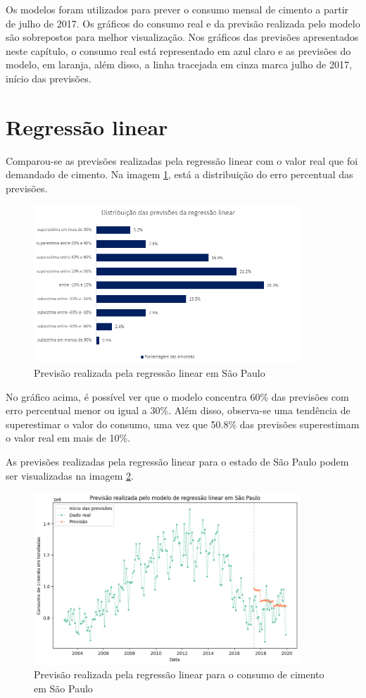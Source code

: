 Os modelos foram utilizados para prever o consumo mensal de 
cimento a partir de julho de 2017. Os gráficos do consumo real 
e da previsão realizada pelo modelo são sobrepostos para melhor
visualização. Nos gráficos das previsões apresentados neste 
capítulo, o consumo real está representado em azul claro e 
as previsões do modelo, em laranja, além disso, a linha 
tracejada em cinza marca julho de 2017, início das previsões.

\section{Regressão linear}

Comparou-se as previsões realizadas pela regressão linear com o valor real 
que foi demandado de cimento. Na imagem \ref{img:erro-perc-rg}, está a 
distribuição do erro percentual das previsões.

\begin{figure}[H]
    \centering
    \includegraphics[width=10cm]{../figuras/graficos/reg_lin/erro-perc-rg.png}
    \caption{Previsão realizada pela regressão linear em São Paulo}
    \label{img:erro-perc-rg}
\end{figure}

No gráfico acima, é possível ver que o modelo concentra 60\% das previsões 
com erro percentual menor ou igual a 30\%. Além disso, observa-se uma 
tendência de superestimar o valor do consumo, uma vez que 50.8\% das previsões
superestimam o valor real em mais de 10\%. 

As previsões realizadas pela regressão linear para o estado 
de São Paulo podem ser visualizadas na imagem \ref{prev-sp-rg}.

\begin{figure}[H]
    \centering
    \includegraphics[width=10cm]{../figuras/graficos/reg_lin/prev_sp.png}
    \caption{Previsão realizada pela regressão linear para o 
    consumo de cimento em São Paulo}
    \label{prev-sp-rg}
\end{figure}

